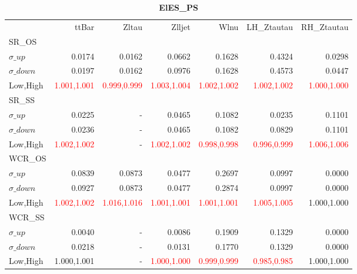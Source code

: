 \documentclass[11pt,oneside,a4paper]{article}
\begin{document}
\begin{table}
\caption{\bf{ElES\_PS}}
\centering
\begin{tabular}{lrrrrrr}
& ttBar & Zltau & Zlljet & Wlnu & LH\_Ztautau & RH\_Ztautau \\

SR\_OS &  &  &  &  &  &  \\
$\sigma\_up$ & 0.0174 & 0.0162 & 0.0662 & 0.1628 & 0.4324 & 0.0298 \\
$\sigma\_down$ & 0.0197 & 0.0162 & 0.0976 & 0.1628 & 0.4573 & 0.0447 \\
Low,High & \textcolor{red}{1.001,1.001} & \textcolor{red}{0.999,0.999} & \textcolor{red}{1.003,1.004} & \textcolor{red}{1.002,1.002} & \textcolor{red}{1.002,1.002} & \textcolor{red}{1.000,1.000} \\

\hline
SR\_SS &  &  &  &  &  &  \\
$\sigma\_up$ & 0.0225 & - & 0.0465 & 0.1082 & 0.0235 & 0.1101 \\
$\sigma\_down$ & 0.0236 & - & 0.0465 & 0.1082 & 0.0829 & 0.1101 \\
Low,High & \textcolor{red}{1.002,1.002} & - & \textcolor{red}{1.002,1.002} & \textcolor{red}{0.998,0.998} & \textcolor{red}{0.996,0.999} & \textcolor{red}{1.006,1.006} \\

\hline
WCR\_OS &  &  &  &  &  &  \\
$\sigma\_up$ & 0.0839 & 0.0873 & 0.0477 & 0.2697 & 0.0997 & 0.0000 \\
$\sigma\_down$ & 0.0927 & 0.0873 & 0.0477 & 0.2874 & 0.0997 & 0.0000 \\
Low,High & \textcolor{red}{1.002,1.002} & \textcolor{red}{1.016,1.016} & \textcolor{red}{1.001,1.001} & \textcolor{red}{1.001,1.001} & \textcolor{red}{1.005,1.005} & 1.000,1.000 \\

\hline
WCR\_SS &  &  &  &  &  &  \\
$\sigma\_up$ & 0.0040 & - & 0.0086 & 0.1909 & 0.1329 & 0.0000 \\
$\sigma\_down$ & 0.0218 & - & 0.0131 & 0.1770 & 0.1329 & 0.0000 \\
Low,High & 1.000,1.001 & - & \textcolor{red}{1.000,1.000} & \textcolor{red}{0.999,0.999} & \textcolor{red}{0.985,0.985} & 1.000,1.000 \\

\end{tabular}
\end{table}
\end{document}
